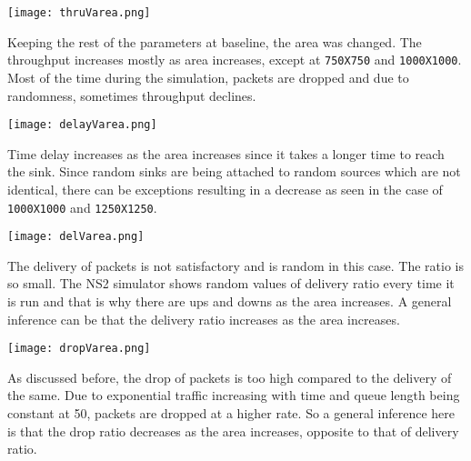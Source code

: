 \documentclass{article}
\begin{document}
\newpage

\begin{center}
    \texttt{[image: thruVarea.png]}
\end{center}

Keeping the rest of the parameters at baseline, the area was changed. The throughput increases mostly as area increases, except at \texttt{750X750} and \texttt{1000X1000}. Most of the time during the simulation, packets are dropped and due to randomness, sometimes throughput declines.

\begin{center}
    \texttt{[image: delayVarea.png]}
\end{center}

Time delay increases as the area increases since it takes a longer time to reach the sink. Since random sinks are being attached to random sources which are not identical, there can be exceptions resulting in a decrease as seen in the case of \texttt{1000X1000} and \texttt{1250X1250}.

\begin{center}
    \texttt{[image: delVarea.png]}
\end{center}

The delivery of packets is not satisfactory and is random in this case. The ratio is so small. The NS2 simulator shows random values of delivery ratio every time it is run and that is why there are ups and downs as the area increases. A general inference can be that the delivery ratio increases as the area increases.

\begin{center}
    \texttt{[image: dropVarea.png]}
\end{center}

As discussed before, the drop of packets is too high compared to the delivery of the same. Due to exponential traffic increasing with time and queue length being constant at 50, packets are dropped at a higher rate. So a general inference here is that the drop ratio decreases as the area increases, opposite to that of delivery ratio.
\end{document}

